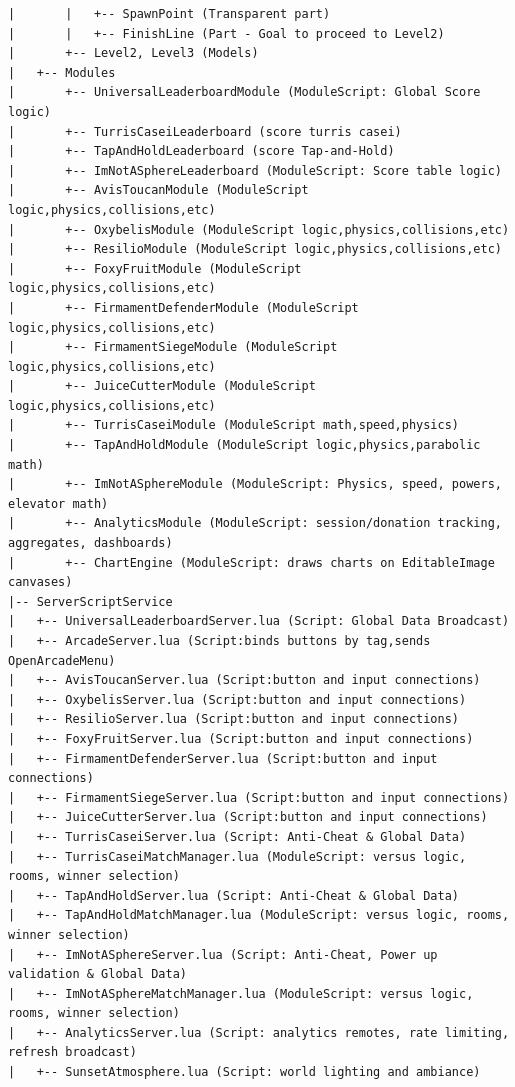 \documentclass[12pt,letterpaper]{article}
\begin{document}
\begin{lstlisting}
|       |   +-- SpawnPoint (Transparent part)
|       |   +-- FinishLine (Part - Goal to proceed to Level2)
|       +-- Level2, Level3 (Models)
|   +-- Modules
|       +-- UniversalLeaderboardModule (ModuleScript: Global Score logic)
|       +-- TurrisCaseiLeaderboard (score turris casei)
|       +-- TapAndHoldLeaderboard (score Tap-and-Hold)
|       +-- ImNotASphereLeaderboard (ModuleScript: Score table logic)
|       +-- AvisToucanModule (ModuleScript logic,physics,collisions,etc)
|       +-- OxybelisModule (ModuleScript logic,physics,collisions,etc)
|       +-- ResilioModule (ModuleScript logic,physics,collisions,etc)
|       +-- FoxyFruitModule (ModuleScript logic,physics,collisions,etc)
|       +-- FirmamentDefenderModule (ModuleScript logic,physics,collisions,etc)
|       +-- FirmamentSiegeModule (ModuleScript logic,physics,collisions,etc)
|       +-- JuiceCutterModule (ModuleScript logic,physics,collisions,etc)
|       +-- TurrisCaseiModule (ModuleScript math,speed,physics)
|       +-- TapAndHoldModule (ModuleScript logic,physics,parabolic math)
|       +-- ImNotASphereModule (ModuleScript: Physics, speed, powers, elevator math)
|       +-- AnalyticsModule (ModuleScript: session/donation tracking, aggregates, dashboards)
|       +-- ChartEngine (ModuleScript: draws charts on EditableImage canvases)
|-- ServerScriptService
|   +-- UniversalLeaderboardServer.lua (Script: Global Data Broadcast)
|   +-- ArcadeServer.lua (Script:binds buttons by tag,sends OpenArcadeMenu)
|   +-- AvisToucanServer.lua (Script:button and input connections)
|   +-- OxybelisServer.lua (Script:button and input connections)
|   +-- ResilioServer.lua (Script:button and input connections)
|   +-- FoxyFruitServer.lua (Script:button and input connections)
|   +-- FirmamentDefenderServer.lua (Script:button and input connections)
|   +-- FirmamentSiegeServer.lua (Script:button and input connections)
|   +-- JuiceCutterServer.lua (Script:button and input connections)
|   +-- TurrisCaseiServer.lua (Script: Anti-Cheat & Global Data)
|   +-- TurrisCaseiMatchManager.lua (ModuleScript: versus logic, rooms, winner selection)
|   +-- TapAndHoldServer.lua (Script: Anti-Cheat & Global Data)
|   +-- TapAndHoldMatchManager.lua (ModuleScript: versus logic, rooms, winner selection)
|   +-- ImNotASphereServer.lua (Script: Anti-Cheat, Power up validation & Global Data)
|   +-- ImNotASphereMatchManager.lua (ModuleScript: versus logic, rooms, winner selection)
|   +-- AnalyticsServer.lua (Script: analytics remotes, rate limiting, refresh broadcast)
|   +-- SunsetAtmosphere.lua (Script: world lighting and ambiance)

\end{lstlisting}
\end{document}
